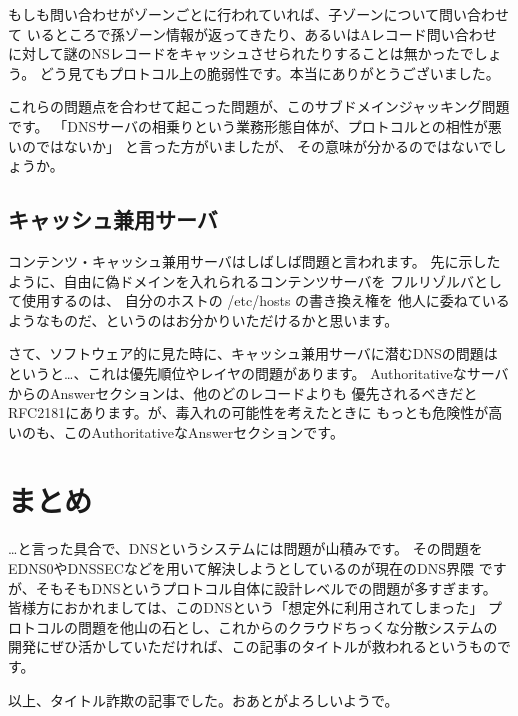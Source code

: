 もしも問い合わせがゾーンごとに行われていれば、子ゾーンについて問い合わせて
いるところで孫ゾーン情報が返ってきたり、あるいはAレコード問い合わせ
に対して謎のNSレコードをキャッシュさせられたりすることは無かったでしょう。
どう見てもプロトコル上の脆弱性です。本当にありがとうございました。

これらの問題点を合わせて起こった問題が、このサブドメインジャッキング問題です。
「DNSサーバの相乗りという業務形態自体が、プロトコルとの相性が悪いのではないか」
と言った方がいましたが、 その意味が分かるのではないでしょうか。


\subsection{ キャッシュ兼用サーバ }
コンテンツ・キャッシュ兼用サーバはしばしば問題と言われます。
先に示したように、自由に偽ドメインを入れられるコンテンツサーバを
フルリゾルバとして使用するのは、 自分のホストの /etc/hosts の書き換え権を
他人に委ねているようなものだ、というのはお分かりいただけるかと思います。

さて、ソフトウェア的に見た時に、キャッシュ兼用サーバに潜むDNSの問題は
というと…、これは優先順位やレイヤの問題があります。
AuthoritativeなサーバからのAnswerセクションは、他のどのレコードよりも
優先されるべきだとRFC2181にあります。が、毒入れの可能性を考えたときに
もっとも危険性が高いのも、このAuthoritativeなAnswerセクションです。


\section{まとめ}
…と言った具合で、DNSというシステムには問題が山積みです。
その問題をEDNS0やDNSSECなどを用いて解決しようとしているのが現在のDNS界隈
ですが、そもそもDNSというプロトコル自体に設計レベルでの問題が多すぎます。
皆様方におかれましては、このDNSという「想定外に利用されてしまった」
プロトコルの問題を他山の石とし、これからのクラウドちっくな分散システムの
開発にぜひ活かしていただければ、この記事のタイトルが救われるというものです。

以上、タイトル詐欺の記事でした。おあとがよろしいようで。

